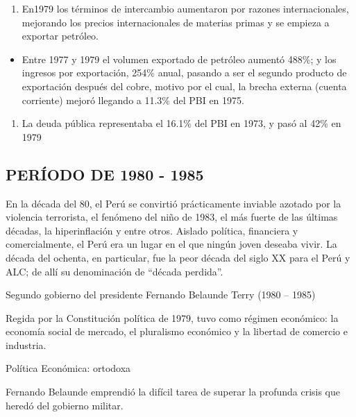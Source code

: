 \documentclass[
  letterpaper,
  DIV=11,
  numbers=noendperiod]{scrartcl}
\providecommand{\tightlist}{%
  \setlength{\itemsep}{0pt}\setlength{\parskip}{0pt}}\usepackage{longtable,booktabs,array}
\begin{document}
\begin{enumerate}
\def\labelenumi{\arabic{enumi}.}
\setcounter{enumi}{5}
\tightlist
\item
  En1979 los términos de intercambio aumentaron por razones
  internacionales, mejorando los precios internacionales de materias
  primas y se empieza a exportar petróleo.
\end{enumerate}

\begin{itemize}
\tightlist
\item
  Entre 1977 y 1979 el volumen exportado de petróleo aumentó 488\%; y
  los ingresos por exportación, 254\% anual, pasando a ser el segundo
  producto de exportación después del cobre, motivo por el cual, la
  brecha externa (cuenta corriente) mejoró llegando a 11.3\% del PBI en
  1975.
\end{itemize}

\begin{enumerate}
\def\labelenumi{\arabic{enumi}.}
\setcounter{enumi}{6}
\tightlist
\item
  La deuda pública representaba el 16.1\% del PBI en 1973, y pasó al
  42\% en 1979
\end{enumerate}

\hypertarget{peruxedodo-de-1980---1985}{%
\subsection{PERÍODO DE 1980 - 1985}\label{peruxedodo-de-1980---1985}}

En la década del 80, el Perú se convirtió prácticamente inviable azotado
por la violencia terrorista, el fenómeno del niño de 1983, el más fuerte
de las últimas décadas, la hiperinflación y entre otros. Aislado
política, financiera y comercialmente, el Perú era un lugar en el que
ningún joven deseaba vivir. La década del ochenta, en particular, fue la
peor década del siglo XX para el Perú y ALC; de allí su denominación de
``década perdida''.

Segundo gobierno del presidente Fernando Belaunde Terry (1980 -- 1985)

Regida por la Constitución política de 1979, tuvo como régimen
económico: la economía social de mercado, el pluralismo económico y la
libertad de comercio e industria.

Política Económica: ortodoxa

Fernando Belaunde emprendió la difícil tarea de superar la profunda
crisis que heredó del gobierno militar.
\end{document}
